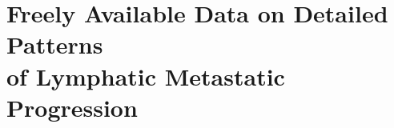 \documentclass[\relativeRoot/main.tex]{subfiles}
\begin{document}
\section[Data on Patterns of Lymphatic Metastatic Progression]{Freely Available Data on Detailed Patterns\\of Lymphatic Metastatic Progression}
\label{sec:discussion:data}
\end{document}
